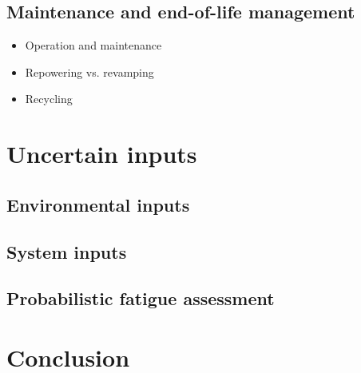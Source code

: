 \subsection{Maintenance and end-of-life management}
\begin{itemize}
    \item Operation and maintenance
    \item Repowering vs. revamping
    \item Recycling 
\end{itemize}


\section{Uncertain inputs} \label{sec:owt_uncertainties}


\subsection{Environmental inputs}



\subsection{System inputs}


\subsection{Probabilistic fatigue assessment}




\section{Conclusion}

